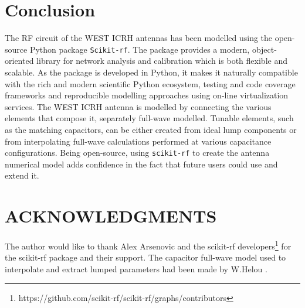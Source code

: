 \documentclass{aip-cp}
\begin{document}
	\section{Conclusion}
	The RF circuit of the WEST ICRH antennas has been modelled using the open-source Python package \texttt{Scikit-rf}. The package provides a modern, object-oriented library for network analysis and calibration which is both flexible and scalable. As the package is developed in Python, it makes it naturally compatible with the rich and modern scientific Python ecosystem, testing and code coverage frameworks and reproducible modelling approaches using on-line virtualization services. The WEST ICRH antenna is modelled by connecting the various elements that compose it, separately full-wave modelled. Tunable elements, such as the matching capacitors, can be either created from ideal lump components or from interpolating full-wave calculations performed at various capacitance configurations. Being open-source, using \texttt{scikit-rf} to create the antenna numerical model adds confidence in the fact that future users could use and extend it.
	
	
	\section{ACKNOWLEDGMENTS}
	The author would like to thank Alex Arsenovic and the  scikit-rf developers\footnote{https://github.com/scikit-rf/scikit-rf/graphs/contributors} for the scikit-rf package and their support. The capacitor full-wave model used to interpolate and extract lumped parameters had been made by W.Helou \cite{Helou2018_PhD}.
	
	
	
\end{document}
